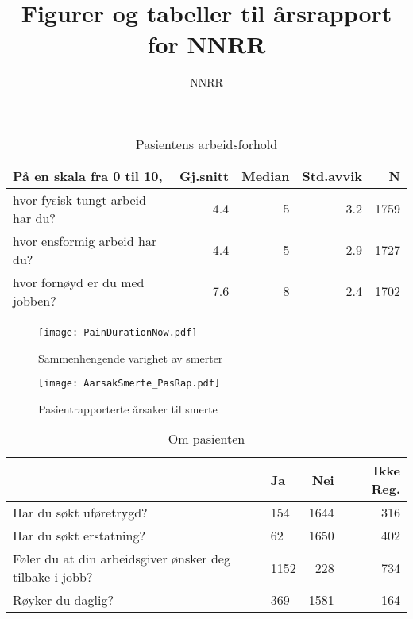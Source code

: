\documentclass[norsk,a4paper]{article}\usepackage[]{graphicx}\usepackage[]{color}
\title{Figurer og tabeller til årsrapport for NNRR}
\author{NNRR}
\begin{document}

\color{moerkgraa}
\thispagestyle{empty}

\maketitle
%
\thispagestyle{empty}
\listoffigures
\listoftables

\clearpage

\newpage

\begin{table}[ht]
\centering
\begin{tabular}{lrrrr}
  \hline
På en skala fra 0 til 10, & Gj.snitt & Median & Std.avvik & N \\ 
  \hline
hvor fysisk tungt arbeid har du? & 4.4 & 5 & 3.2 & 1759 \\ 
  hvor ensformig arbeid har du? & 4.4 & 5 & 2.9 & 1727 \\ 
  hvor fornøyd er du med jobben? & 7.6 & 8 & 2.4 & 1702 \\ 
   \hline
\end{tabular}
\caption{Pasientens arbeidsforhold} 
\end{table}




\begin{figure}[ht]
\centering
\texttt{[image: PainDurationNow.pdf]}
\caption{Sammenhengende varighet av smerter}
\end{figure}

\begin{figure}[ht]
\centering
\texttt{[image: AarsakSmerte\_PasRap.pdf]}
\caption{Pasientrapporterte årsaker til smerte}
\end{figure}


\begin{table}[ht]
\centering
\begin{tabular}{llrr}
  \hline
 & Ja & Nei & Ikke Reg. \\ 
  \hline
Har du søkt uføretrygd? & 154 & 1644 & 316 \\ 
  Har du søkt erstatning? & 62 & 1650 & 402 \\ 
  Føler du at din arbeidsgiver ønsker deg tilbake i jobb? & 1152 & 228 & 734 \\ 
  Røyker du daglig? & 369 & 1581 & 164 \\ 
   \hline
\end{tabular}
\caption{Om pasienten} 
\end{table}
\end{document}
